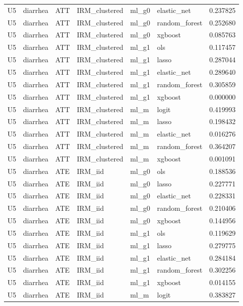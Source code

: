 \begin{longtable}{llllllr}
U5 & diarrhea & ATT & IRM\_clustered & ml\_g0 & elastic\_net & 0.237825 \\
U5 & diarrhea & ATT & IRM\_clustered & ml\_g0 & random\_forest & 0.252680 \\
U5 & diarrhea & ATT & IRM\_clustered & ml\_g0 & xgboost & 0.085763 \\
U5 & diarrhea & ATT & IRM\_clustered & ml\_g1 & ols & 0.117457 \\
U5 & diarrhea & ATT & IRM\_clustered & ml\_g1 & lasso & 0.287044 \\
U5 & diarrhea & ATT & IRM\_clustered & ml\_g1 & elastic\_net & 0.289640 \\
U5 & diarrhea & ATT & IRM\_clustered & ml\_g1 & random\_forest & 0.305859 \\
U5 & diarrhea & ATT & IRM\_clustered & ml\_g1 & xgboost & 0.000000 \\
U5 & diarrhea & ATT & IRM\_clustered & ml\_m & logit & 0.419993 \\
U5 & diarrhea & ATT & IRM\_clustered & ml\_m & lasso & 0.198432 \\
U5 & diarrhea & ATT & IRM\_clustered & ml\_m & elastic\_net & 0.016276 \\
U5 & diarrhea & ATT & IRM\_clustered & ml\_m & random\_forest & 0.364207 \\
U5 & diarrhea & ATT & IRM\_clustered & ml\_m & xgboost & 0.001091 \\
U5 & diarrhea & ATE & IRM\_iid & ml\_g0 & ols & 0.188536 \\
U5 & diarrhea & ATE & IRM\_iid & ml\_g0 & lasso & 0.227771 \\
U5 & diarrhea & ATE & IRM\_iid & ml\_g0 & elastic\_net & 0.228331 \\
U5 & diarrhea & ATE & IRM\_iid & ml\_g0 & random\_forest & 0.210406 \\
U5 & diarrhea & ATE & IRM\_iid & ml\_g0 & xgboost & 0.144956 \\
U5 & diarrhea & ATE & IRM\_iid & ml\_g1 & ols & 0.119629 \\
U5 & diarrhea & ATE & IRM\_iid & ml\_g1 & lasso & 0.279775 \\
U5 & diarrhea & ATE & IRM\_iid & ml\_g1 & elastic\_net & 0.284184 \\
U5 & diarrhea & ATE & IRM\_iid & ml\_g1 & random\_forest & 0.302256 \\
U5 & diarrhea & ATE & IRM\_iid & ml\_g1 & xgboost & 0.014155 \\
U5 & diarrhea & ATE & IRM\_iid & ml\_m & logit & 0.383827 \\

\end{longtable}
